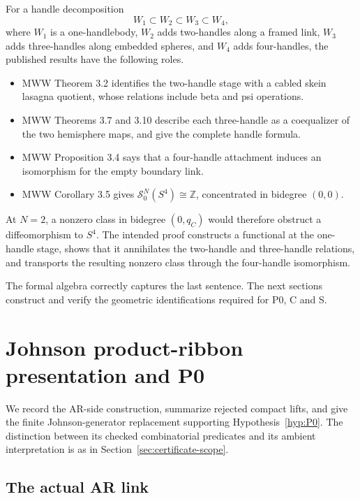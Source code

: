 \documentclass[11pt]{amsart}
\theoremstyle{definition}
\theoremstyle{remark}
\newcommand{\Z}{\mathbb{Z}}
\newcommand{\SN}{\mathcal{S}^{N}_{0}}
\begin{document}
For a handle decomposition
\[
W_1\subset W_2\subset W_3\subset W_4,
\]
where $W_1$ is a one-handlebody, $W_2$ adds two-handles along a framed link,
$W_3$ adds three-handles along embedded spheres, and $W_4$ adds four-handles,
the published results have the following roles.
\begin{itemize}
\item MWW Theorem 3.2 identifies the two-handle stage with a cabled skein
lasagna quotient, whose relations include beta and psi operations.
\item MWW Theorems 3.7 and 3.10 describe each three-handle as a coequalizer
of the two hemisphere maps, and give the complete handle formula.
\item MWW Proposition 3.4 says that a four-handle attachment induces an
isomorphism for the empty boundary link.
\item MWW Corollary 3.5 gives
$\SN(S^4)\cong\Z$, concentrated in bidegree $(0,0)$.
\end{itemize}

At $N=2$, a nonzero class in bidegree $(0,q_C)$ would therefore obstruct a
diffeomorphism to $S^4$.  The intended proof constructs a functional at the
one-handle stage, shows that it annihilates the two-handle and three-handle
relations, and transports the resulting nonzero class through the
four-handle isomorphism.

The formal algebra correctly captures the last sentence.  The next sections
construct and verify the geometric identifications required for P0, C and S.

\section{Johnson product-ribbon presentation and P0}\label{sec:johnson-presentation}

We record the AR-side construction, summarize rejected compact lifts, and
give the finite Johnson-generator replacement supporting
Hypothesis~\ref{hyp:P0}.  The distinction between its checked combinatorial
predicates and its ambient interpretation is as in
Section~\ref{sec:certificate-scope}.

\subsection{The actual AR link}
\end{document}
